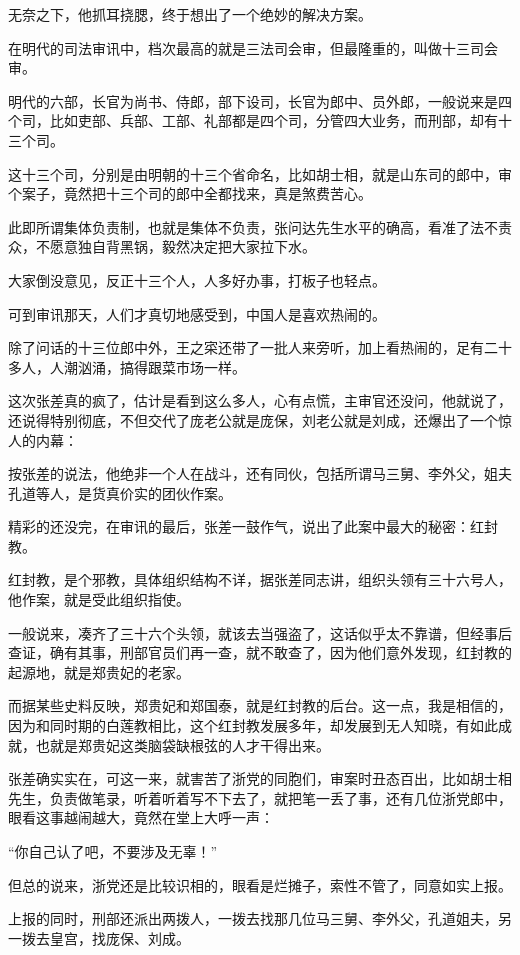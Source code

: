 \begin{multicols}{\theparacolNo}
		无奈之下，他抓耳挠腮，终于想出了一个绝妙的解决方案。

		在明代的司法审讯中，档次最高的就是三法司会审，但最隆重的，叫做十三司会审。

		明代的六部，长官为尚书、侍郎，部下设司，长官为郎中、员外郎，一般说来是四个司，比如吏部、兵部、工部、礼部都是四个司，分管四大业务，而刑部，却有十三个司。

		这十三个司，分别是由明朝的十三个省命名，比如胡士相，就是山东司的郎中，审个案子，竟然把十三个司的郎中全都找来，真是煞费苦心。

		此即所谓集体负责制，也就是集体不负责，张问达先生水平的确高，看准了法不责众，不愿意独自背黑锅，毅然决定把大家拉下水。

		大家倒没意见，反正十三个人，人多好办事，打板子也轻点。

		可到审讯那天，人们才真切地感受到，中国人是喜欢热闹的。

		除了问话的十三位郎中外，王之寀还带了一批人来旁听，加上看热闹的，足有二十多人，人潮汹涌，搞得跟菜市场一样。

		这次张差真的疯了，估计是看到这么多人，心有点慌，主审官还没问，他就说了，还说得特别彻底，不但交代了庞老公就是庞保，刘老公就是刘成，还爆出了一个惊人的内幕：

		按张差的说法，他绝非一个人在战斗，还有同伙，包括所谓马三舅、李外父，姐夫孔道等人，是货真价实的团伙作案。

		精彩的还没完，在审讯的最后，张差一鼓作气，说出了此案中最大的秘密：红封教。

		红封教，是个邪教，具体组织结构不详，据张差同志讲，组织头领有三十六号人，他作案，就是受此组织指使。

		一般说来，凑齐了三十六个头领，就该去当强盗了，这话似乎太不靠谱，但经事后查证，确有其事，刑部官员们再一查，就不敢查了，因为他们意外发现，红封教的起源地，就是郑贵妃的老家。

		而据某些史料反映，郑贵妃和郑国泰，就是红封教的后台。这一点，我是相信的，因为和同时期的白莲教相比，这个红封教发展多年，却发展到无人知晓，有如此成就，也就是郑贵妃这类脑袋缺根弦的人才干得出来。

		张差确实实在，可这一来，就害苦了浙党的同胞们，审案时丑态百出，比如胡士相先生，负责做笔录，听着听着写不下去了，就把笔一丢了事，还有几位浙党郎中，眼看这事越闹越大，竟然在堂上大呼一声：

		“你自己认了吧，不要涉及无辜！”

		但总的说来，浙党还是比较识相的，眼看是烂摊子，索性不管了，同意如实上报。

		上报的同时，刑部还派出两拨人，一拨去找那几位马三舅、李外父，孔道姐夫，另一拨去皇宫，找庞保、刘成。


\end{multicols}
